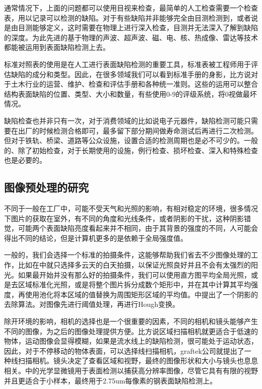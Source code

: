 通常情况下，上面的问题都可以使用目视来检查，最简单的人工检查需要一个检查表，用以记录可以检测的缺陷。对于有些缺陷并非能够完全由目测检测到，或者说是由目测能够定义，这时需要在物理上进行深入检查，目测并无法深入了解到缺陷的深度。为此先进的基于物理的声波、超声波、磁、电、核、热成像、雷达等技术都能被运用到表面缺陷检测上去。\cite{doi:101061}

标准对照表的使用是在人工进行表面缺陷检测的重要工具，标准表被工程师用于评估缺陷的成分和类型。因此，在很多领域我们可以看到标准手册的身影，比方说对于土木行业的运营、维护、检查和评估手册和各种统一准则。这些的运用可以整合结构表面缺陷的位置、类型、大小和数量，有些使用0-9的评级系统，将0视做最坏情况。\cite{koch2015review}

缺陷检查也并非只有一次，对于消费领域的比如说电子元器件，缺陷检测可能只需要在出厂的时候检测合格即可，最多留下部分期间做寿命测试后再进行二次检测。但对于铁轨、桥梁、道路等公众设施，设置合适的检测周期也是必不可少的。一般的、除了初始检查，对于长期使用的设施，例行检查、损坏检查、深入和特殊检查\cite{operations2015evaluation}也是必要的。

\subsection{图像预处理的研究}

不同于一般在工厂中，可能不受天气和光照的影响，有相对稳定的环境，很多情况下图片的获取在室外，有不同的角度和光线条件，或者阴影的干扰，这种阴影错觉，可能两个表面缺陷亮度看起来并不相同，由于其背景的强度的不同，人可能会得出不同的结论，但是计算机更多的是依赖于全局强度值。

一般的，我们会选择一个标准的拍摄条件，这能够帮助我们省去不少图像处理的工作，比如在\cite{varadharajan2014vision}中就只选择多云天的白天拍摄，以保证光照良好并且不会有太强烈的阳光。如果最开始并没有那么好的拍摄条件，我们可以使用直方图平均全局光照，或是去区域标准化光照，或是将整个图片拆分成数个矩形中，并在其中计算其平均强度，再使用池化将本区域的值替换为周围矩形区域的平均值。\cite{ZOU2012227}中提出了一个阴影的去除算法。\cite{nguyen2009automatic}对图像先进行阈值处理，再进行Hough变换。

除开环境的影响，相机的选择也是一个很重要的因素，不同的相机和镜头能够产生不同的图像，为之后的图像处理提供方便。比方说区域扫描相机就更适合于低速的物体，运动图像会显得模糊，如果是流水线上的缺陷检测，很可能处于运动状态，因此，对于不停移动的物体表面，可以选择线扫描相机，graftek公司就提出了一种线扫描相机。镜头决定了查看区域和视野，最终的图像形状和大小与镜头也息息相关。\cite{Buck2013}中的光学显微镜用于表面检测以捕获高分辨率图像，尽管它具有有限的视野并且更适合于小样本，最终用于2.75um每像素的钢表面缺陷检测上。

